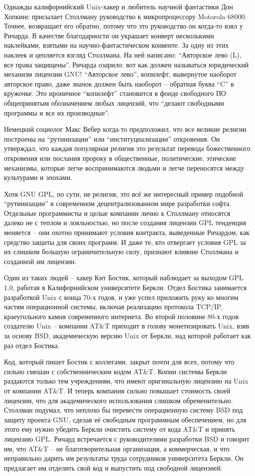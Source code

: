Однажды калифорнийский Unix-хакер и любитель научной фантастики Дон Хопкинс присылает Столлману руководство к микропроцессору Motorola 68000. Точнее, возвращает его обратно, потому что это руководство он когда-то взял у Ричарда. В качестве благодарности он украшает конверт несколькими наклейками, взятыми на научно-фантастическом конвенте. За одну из этих наклеек и цепляется взгляд Столлмана. На ней написано: ``Авторское лево (L), все права защищены''. Ричарда озарило: вот как должен называться юридический механизм лицензии GNU! ``Авторское лево'', копилефт, вывернутое наоборот авторское право, даже значок должен быть наоборот -- обратная буква ``C'' в кружочке. Это ироничное ``копилефт'' становится в фонде свободного ПО общепринятым обозначением любых лицензий, что ``делают свободными программы и все их производные''.

Немецкий социолог Макс Вебер когда-то предположил, что все великие религии построены на ``рутинизации'' или ``институциализации'' откровения. Он утверждал, что каждая популярная религия это результат перевода божественного откровения или послания пророку в общественные, политические, этические механизмы, которые легче воспринимаются людьми и легче переносятся между культурами и эпохами.

Хотя GNU GPL, по сути, не религия, это всё же интересный пример подобной ``рутинизации'' в современном децентрализованном мире разработки софта. Отдельные программисты и целые компании лично к Столлману относятся далеко не с теплом и лояльностью, но после создания лицензии GPL тенденция меняется -- они охотно принимают условия контракта, выведенные Ричардом, как средство защиты для своих программ. И даже те, кто отвергает условия GPL за их слишком большую ограничительную силу, признают влияние Столлмана и созданной им лицензии.

Один из таких людей -- хакер Кит Бостик, который наблюдает за выходом GPL 1.0, работая в Калифорнийском университете Беркли. Отдел Бостика занимается разработкой Unix с конца 70-х годов, и уже успел приложить руку ко многим частям операционной системы, включая реализацию протокола TCP/IP, краеугольного камня современного интернета. Во второй половине 80-х годов создателю Unix -- компании AT\&T приходит в голову монетизировать Unix, взяв за основу BSD, академическую версию Unix от Беркли, над которой работает как раз отдел Бостика.

Код, который пишет Бостик с коллегами, закрыт почти для всех, потому что сильно смешан с собственническим кодом AT\&T. Копии системы Беркли раздаются только тем учреждениям, что имеют оригинальную лицензию на Unix от компании AT\&T. И теперь компания сильно повышает стоимость своей лицензии, что для академического использования слишком обременительно. Столлман подумал, что неплохо бы перевести операционную систему BSD под защиту проекта GNU, сделав её свободным программным обеспечением, но для этого ему нужно убедить Беркли очистить систему от кода AT\&T и принять лицензию GPL. Ричард встречается с руководителями разработки BSD и говорит им, что AT\&T -- не благотворительная организация, а коммерческая, и что неправильно дарить им результаты труда сотрудников университета Беркли. Он предлагает им отделить свой код и выпустить под свободной лицензией.

